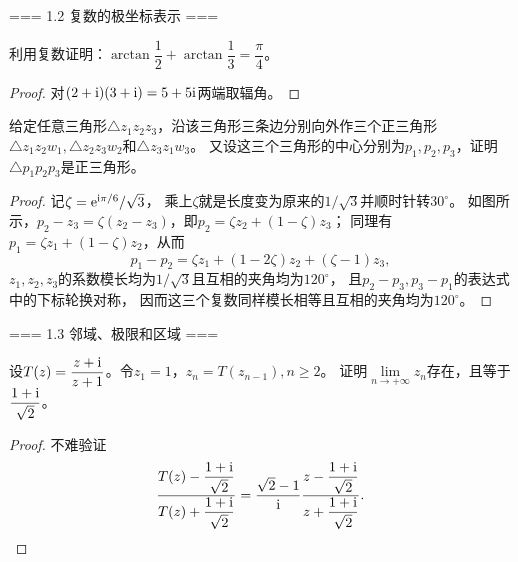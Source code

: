 === 1.2 复数的极坐标表示 ===
\begin{4}
    利用复数证明：$\arctan\dfrac{1}{2}+\arctan\dfrac{1}{3}=\dfrac{\pi}{4}$。
\end{4}
\begin{proof}
    对$(2+{\rm i})(3+{\rm i})=5+5{\rm i}$两端取辐角。
\end{proof}

\begin{9}
    给定任意三角形$\triangle z_1z_2z_3$，沿该三角形三条边分别向外作三个正三角形
    $\triangle z_1z_2w_1,\triangle z_2z_3w_2$和$\triangle z_3z_1w_3$。
    又设这三个三角形的中心分别为$p_1,p_2,p_3$，证明$\triangle p_1p_2p_3$是正三角形。
\end{9}
\begin{proof}
    记$\zeta={\rm e}^{{\rm i}\pi/6}/\sqrt{3}$，
    乘上$\zeta$就是长度变为原来的$1/\sqrt{3}$并顺时针转$30^\circ$。
    如图所示，$p_2-z_3=\zeta(z_2-z_3)$，即$p_2=\zeta z_2+(1-\zeta)z_3$；
    同理有$p_1=\zeta z_1+(1-\zeta)z_2$，从而
    \[p_1-p_2=\zeta z_1+(1-2\zeta)z_2+(\zeta-1)z_3,\]
    $z_1,z_2,z_3$的系数模长均为$1/\sqrt{3}$且互相的夹角均为$120^\circ$，
    且$p_2-p_3,p_3-p_1$的表达式中的下标轮换对称，
    因而这三个复数同样模长相等且互相的夹角均为$120^\circ$。
\end{proof}

=== 1.3 邻域、极限和区域 ===
\begin{3}
    设$T(z)=\dfrac{z+{\rm i}}{z+1}$。令$z_1=1$，$z_n=T(z_{n-1}),n\ge2$。
    证明$\lim\limits_{n\to+\infty}z_n$存在，且等于$\dfrac{1+{\rm i}}{\sqrt{2}}$。
\end{3}
\begin{proof}
    不难验证
    \[\frac{T(z)-\dfrac{1+{\rm i}}{\sqrt{2}}}{T(z)+\dfrac{1+{\rm i}}{\sqrt{2}}}
    =\frac{\sqrt{2}-1}{{\rm i}}\frac{z-\dfrac{1+{\rm i}}{\sqrt{2}}}{z+\dfrac{1+{\rm i}}{\sqrt{2}}}.\qedhere\]
\end{proof}

